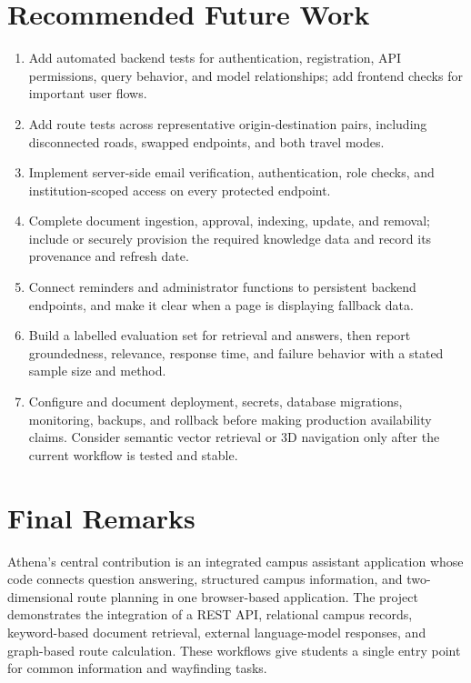 \documentclass[11pt,a4paper]{report}
\begin{document}
\section{Recommended Future Work}
\begin{enumerate}[leftmargin=*]
  \item Add automated backend tests for authentication, registration, API
    permissions, query behavior, and model relationships; add frontend checks
    for important user flows.
  \item Add route tests across representative origin-destination pairs,
    including disconnected roads, swapped endpoints, and both travel modes.
  \item Implement server-side email verification, authentication, role checks,
    and institution-scoped access on every protected endpoint.
  \item Complete document ingestion, approval, indexing, update, and removal;
    include or securely provision the required knowledge data and record its
    provenance and refresh date.
  \item Connect reminders and administrator functions to persistent backend
    endpoints, and make it clear when a page is displaying fallback data.
  \item Build a labelled evaluation set for retrieval and answers, then report
    groundedness, relevance, response time, and failure behavior with a stated
    sample size and method.
  \item Configure and document deployment, secrets, database migrations,
    monitoring, backups, and rollback before making production availability
    claims. Consider semantic vector retrieval or 3D navigation only after the
    current workflow is tested and stable.
\end{enumerate}

\section{Final Remarks}
Athena's central contribution is an integrated campus assistant application
whose code connects question answering, structured campus information, and
two-dimensional route planning in one browser-based application. The project
demonstrates the integration of a REST API, relational campus records,
keyword-based document retrieval, external language-model responses, and
graph-based route calculation. These workflows give students a single entry
point for common information and wayfinding tasks.
\end{document}
